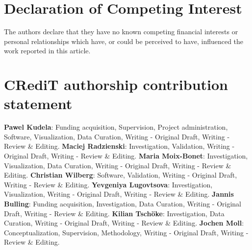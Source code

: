 \documentclass[times,final]{elsarticle}
\begin{document}
\section*{Declaration of Competing Interest}

The authors declare that they have no known competing
financial interests or personal relationships which have, or could be
perceived to have, influenced the work reported in this article. 

{\color{red}
\section*{CRediT authorship contribution statement}
\textbf{Pawel Kudela}: Funding acquisition, Supervision, Project administration, Software, Visualization, Data Curation, Writing - Original Draft, Writing - Review \& Editing.
\textbf{Maciej Radzienski}: Investigation, Validation, Writing - Original Draft, Writing - Review \& Editing. \textbf{Maria Moix-Bonet}: Investigation, Visualization, Data Curation, Writing - Original Draft, Writing - Review \& Editing. \textbf{Christian Wilberg}: Software, Validation, Writing - Original Draft, Writing - Review \& Editing.
\textbf{Yevgeniya Lugovtsova}: Investigation, Visualization, Writing - Original Draft, Writing - Review \& Editing.
\textbf{Jannis Bulling}: Funding acquisition, Investigation, Data Curation, Writing - Original Draft, Writing - Review \& Editing. \textbf{Kilian Tsch\"oke}: Investigation, Data Curation, Writing - Original Draft, Writing - Review \& Editing. \textbf{Jochen Moll}: Conceptualization, Supervision, Methodology, Writing - Original Draft, Writing - Review \& Editing.}


%

\end{document}
